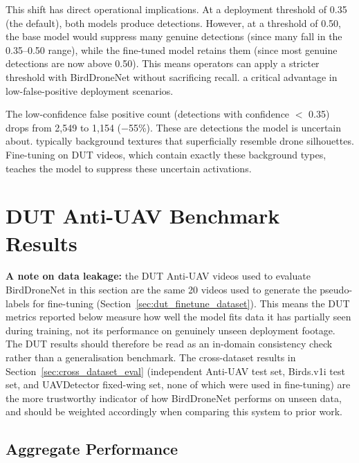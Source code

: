 \documentclass[12pt,a4paper]{report}
\begin{document}
This shift has direct operational implications. At a deployment threshold
of 0.35 (the default), both models produce detections. However, at a
threshold of 0.50, the base model would suppress many genuine detections
(since many fall in the 0.35--0.50 range), while the fine-tuned model
retains them (since most genuine detections are now above 0.50). This
means operators can apply a stricter threshold with BirdDroneNet
without sacrificing recall. a critical advantage in low-false-positive
deployment scenarios.

The low-confidence false positive count (detections with confidence $<$ 0.35)
drops from 2,549 to 1,154 ($-$55\%). These are detections the model is
uncertain about. typically background textures that superficially resemble
drone silhouettes. Fine-tuning on DUT videos, which contain exactly these
background types, teaches the model to suppress these uncertain activations.

\section{DUT Anti-UAV Benchmark Results}

\textbf{A note on data leakage:} the DUT Anti-UAV videos used to evaluate
BirdDroneNet in this section are the same 20 videos used to generate the
pseudo-labels for fine-tuning (Section~\ref{sec:dut_finetune_dataset}). This means the DUT metrics
reported below measure how well the model fits data it has partially seen
during training, not its performance on genuinely unseen deployment
footage. The DUT results should therefore be read as an in-domain
consistency check rather than a generalisation benchmark. The cross-dataset
results in Section~\ref{sec:cross_dataset_eval} (independent Anti-UAV test set, Birds.v1i test set,
and UAVDetector fixed-wing set, none of which were used in fine-tuning)
are the more trustworthy indicator of how BirdDroneNet performs on unseen
data, and should be weighted accordingly when comparing this system to
prior work.

\subsection{Aggregate Performance}
\end{document}
